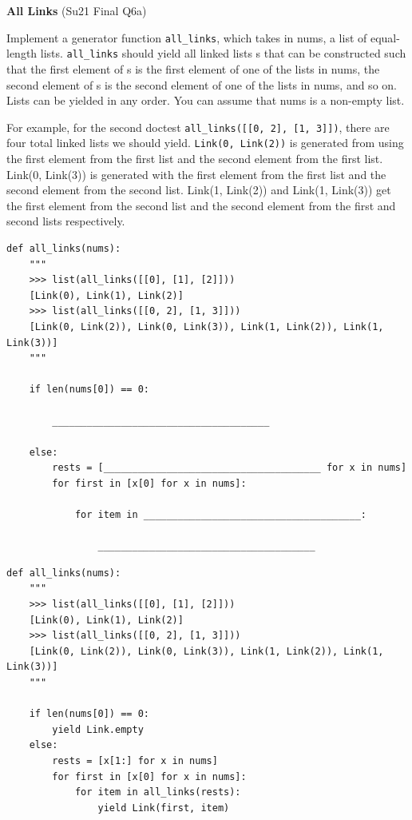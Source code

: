 \documentclass{exam}
\newlength{\currentparskip}
\newenvironment{blocksection}
{
    \setlength{\currentparskip}{\parskip}%
    \begin{minipage}{\linewidth}
    \setlength{\parskip}{\currentparskip}%
}
{
    \end{minipage}
}
\begin{document}
\begin{questions}
\begin{blocksection}
\question \textbf{All Links} (Su21 Final Q6a)

    Implement a generator function \lstinline{all_links}, which takes in nums, a list of equal-length lists. \lstinline{all_links} should yield all linked lists s that can be constructed such that the first element of s is the first element of one of the lists in nums, the second element of s is the second element of one of the lists in nums, and so on. Lists can be yielded in any order. You can assume that nums is a non-empty list.
    
    For example, for the second doctest \lstinline{all_links([[0, 2], [1, 3]])}, there are four total linked lists we should yield. \lstinline{Link(0, Link(2))} is generated from using the first element from the first list and the second element from the first list. Link(0, Link(3)) is generated with the first element from the first list and the second element from the second list. Link(1, Link(2)) and Link(1, Link(3)) get the first element from the second list and the second element from the first and second lists respectively.
\begin{lstlisting}
def all_links(nums):
    """
    >>> list(all_links([[0], [1], [2]]))
    [Link(0), Link(1), Link(2)]
    >>> list(all_links([[0, 2], [1, 3]]))
    [Link(0, Link(2)), Link(0, Link(3)), Link(1, Link(2)), Link(1, Link(3))]
    """
    
    if len(nums[0]) == 0:

        ______________________________________

    else:
        rests = [______________________________________ for x in nums]
        for first in [x[0] for x in nums]:

            for item in ______________________________________:

                ______________________________________
\end{lstlisting}
\end{blocksection}
\begin{solution}
\begin{lstlisting}
def all_links(nums):
    """
    >>> list(all_links([[0], [1], [2]]))
    [Link(0), Link(1), Link(2)]
    >>> list(all_links([[0, 2], [1, 3]]))
    [Link(0, Link(2)), Link(0, Link(3)), Link(1, Link(2)), Link(1, Link(3))]
    """
        
    if len(nums[0]) == 0:
        yield Link.empty
    else:
        rests = [x[1:] for x in nums]
        for first in [x[0] for x in nums]:
            for item in all_links(rests):
                yield Link(first, item)
\end{lstlisting}
\end{solution}
\end{questions}
\end{document}
